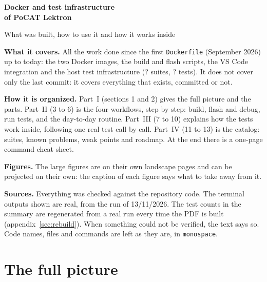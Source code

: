 \documentclass[11pt,a4paper]{article}
\DeclareRobustCommand{\_}{\textunderscore\allowbreak}
\newcommand{\cd}[1]{\texttt{#1}}
\def\TRsuites{?}\def\TRsuitesGreen{?}\def\TRsuitesCrashed{0}
\def\TRtests{?}\def\TRpassed{?}\def\TRfailed{?}\def\TRignored{?}
\begin{document}
\begin{titlepage}
\centering
\vspace*{2.2cm}
{\Huge\bfseries Docker and test infrastructure\\[6pt] of PoCAT Lektron\par}
\vspace{0.8cm}
{\Large What was built, how to use it and how it works inside\par}
\vspace{2.5cm}

\begin{minipage}{0.86\textwidth}
\small
\textbf{What it covers.} All the work done since the first \cd{Dockerfile} (September 2026)
up to today: the two Docker images, the build and flash scripts, the
VS Code integration and the host test infrastructure (\TRsuites{} suites, \TRtests{} tests).
It does not cover only the last commit: it covers everything that exists, committed or not.

\medskip
\textbf{How it is organized.} Part~I (sections 1 and 2) gives the full picture and the
parts. Part~II (3 to 6) is the four workflows, step by step: build,
flash and debug, run tests, and the day-to-day routine. Part~III (7 to 10) explains how
the tests work inside, following one real test call by call. Part~IV
(11 to 13) is the catalog: suites, known problems, weak points and roadmap.
At the end there is a one-page command cheat sheet.

\medskip
\textbf{Figures.} The large figures are on their own landscape pages and can be
projected on their own: the caption of each figure says what to take away from it.

\medskip
\textbf{Sources.} Everything was checked against the repository code. The terminal
outputs shown are real, from the run of 13/11/2026. The test counts in the summary
are regenerated from a real run every time the PDF is built (appendix~\ref{sec:rebuild}). When something
could not be verified, the text says so. Code names, files and commands are
left as they are, in \cd{monospace}.
\end{minipage}
\vfill
\end{titlepage}

\tableofcontents
\clearpage
\part{The full picture}
\end{document}

